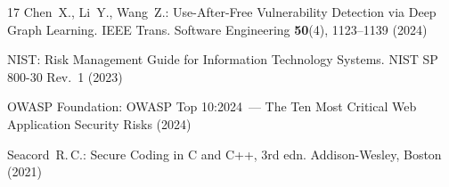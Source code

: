 \documentclass[runningheads]{llncs}
\begin{document}
\begin{thebibliography}{17}
Chen~X., Li~Y., Wang~Z.:
Use-After-Free Vulnerability Detection via Deep Graph Learning.
IEEE Trans. Software Engineering \textbf{50}(4), 1123--1139 (2024)

NIST:
Risk Management Guide for Information Technology Systems.
NIST SP 800-30 Rev.~1 (2023)

OWASP Foundation:
OWASP Top 10:2024~--- The Ten Most Critical Web Application Security Risks (2024)

Seacord~R.\,C.:
Secure Coding in C and C++, 3rd edn. Addison-Wesley, Boston (2021)

\end{thebibliography}
\end{document}
